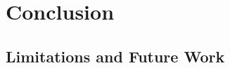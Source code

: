 %


\chapter{Conclusion}
\label{ch:conclusion}


\section{Limitations and Future Work}
\label{sec:future-work}


%

\begin{comment}
\chapter{UNSORTED}

\section{NPC formula}
\label{sec:npc-formula}

\end{comment}